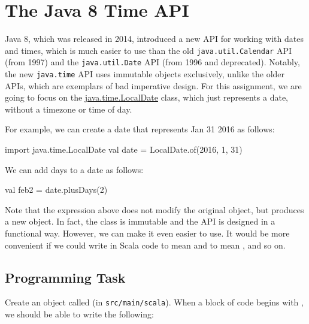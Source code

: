 \section{The Java 8 Time API}

Java 8, which was released in 2014, introduced a new API for working with dates and times, which is much easier to use than the old \texttt{java.util.Calendar} API (from 1997) and the \texttt{java.util.Date} API (from 1996 and deprecated). Notably, the new \texttt{java.time} API uses immutable objects exclusively, unlike the older APIs, which are exemplars of bad imperative design. For this assignment, we are going to focus on the \href{https://docs.oracle.com/javase/8/docs/api/java/time/LocalDate.html}{java.time.LocalDate} class, which just represents a date, without a timezone or time of day.

For example, we can create a date that represents Jan 31 2016 as follows:
\begin{scalacode}
import java.time.LocalDate
val date = LocalDate.of(2016, 1, 31)
\end{scalacode}

We can add days to a date as follows:
\begin{scalacode}
val feb2 = date.plusDays(2)
\end{scalacode}

Note that the expression above does not modify the original  object, but produces a new object. In fact, the  class is immutable and the API is designed in a functional way. However, we can make it even easier to use. It would be more convenient if we could write  in Scala code to mean  and  to mean , and so on.

\subsection{Programming Task}

Create an object called  (in \texttt{src/main/scala}). When a block of code begins with , we should be able to write the following:

